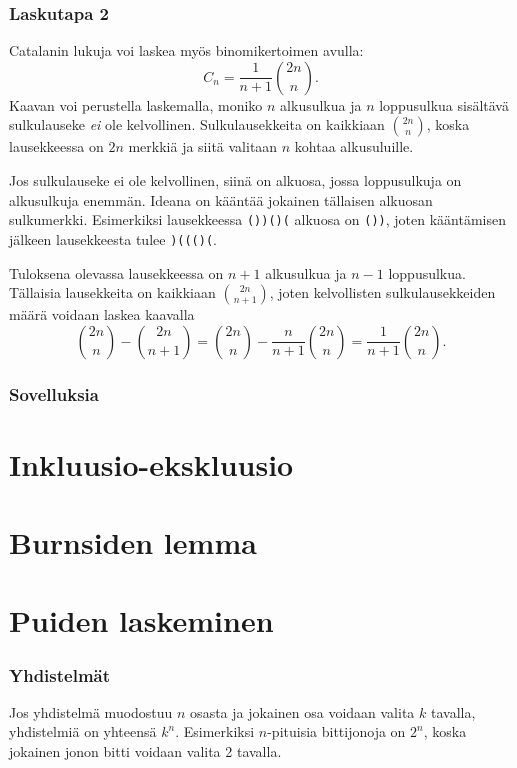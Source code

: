 \subsubsection{Laskutapa 2}

Catalanin lukuja voi laskea myös binomikertoimen avulla:
\[ C_n = \frac{1}{n+1} {2n \choose n}. \]
Kaavan voi perustella laskemalla, moniko $n$ alkusulkua
ja $n$ loppusulkua sisältävä sulkulauseke \textit{ei}
ole kelvollinen.
Sulkulausekkeita on kaikkiaan ${2n \choose n}$,
koska lausekkeessa on $2n$ merkkiä ja siitä valitaan
$n$ kohtaa alkusuluille.

Jos sulkulauseke ei ole kelvollinen,
siinä on alkuosa, jossa loppusulkuja on alkusulkuja
enemmän.
Ideana on kääntää jokainen tällaisen alkuosan
sulkumerkki.
Esimerkiksi lausekkeessa \texttt{())()(}
alkuosa on \texttt{())}, joten kääntämisen
jälkeen lausekkeesta tulee \texttt{)((()(}.

Tuloksena olevassa lausekkeessa on $n+1$ alkusulkua
ja $n-1$ loppusulkua. Tällaisia lausekkeita on
kaikkiaan ${2n \choose n+1}$, joten kelvollisten
sulkulausekkeiden määrä voidaan laskea kaavalla
\[{2n \choose n}-{2n \choose n+1} = {2n \choose n} - \frac{n}{n+1} {2n \choose n} = \frac{1}{n+1} {2n \choose n}.\]

\subsubsection{Sovelluksia}

\section{Inkluusio-ekskluusio}

\section{Burnsiden lemma}

\section{Puiden laskeminen}



\subsubsection*{Yhdistelmät}

Jos yhdistelmä muodostuu $n$ osasta ja jokainen osa
voidaan valita $k$ tavalla, yhdistelmiä on yhteensä $k^n$.
Esimerkiksi $n$-pituisia bittijonoja on $2^n$,
koska jokainen jonon bitti voidaan valita 2 tavalla.

